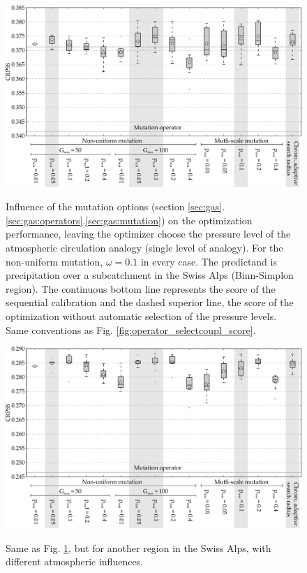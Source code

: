 \documentclass{ametsoc}
\begin{document}
\begin{figure}[t]
	\begin{center}
		\noindent\includegraphics[width=33pc,angle=0]{fig08.pdf}\\
	\end{center}
	\caption{Influence of the mutation options (section \ref{sec:gas}.\ref{sec:gas:operators}.\ref{sec:gas:mutation}) on the optimization performance, leaving the optimizer choose the pressure level of the atmospheric circulation analogy (single level of analogy). For the non-uniform mutation, $\omega=0.1$ in every case. The predictand is precipitation over a subcatchment in the Swiss Alps (Binn-Simplon region). The continuous bottom line represents the score of the sequential calibration and the dashed superior line, the score of the optimization without automatic selection of the pressure levels. Same conventions as Fig. \ref{fig:operator_selectcoupl_score}.}
	\label{fig:operator_mutation_score_atmlevel}
\end{figure}

\begin{figure}[t]
	\begin{center}
		\noindent\includegraphics[width=33pc,angle=0]{fig09.pdf}\\
	\end{center}
	\caption{Same as Fig. \ref{fig:operator_mutation_score_atmlevel}, but for another region in the Swiss Alps, with different atmospheric influences.}
	\label{fig:operator_mutation_score_rhoneamont}
\end{figure}
\end{document}
